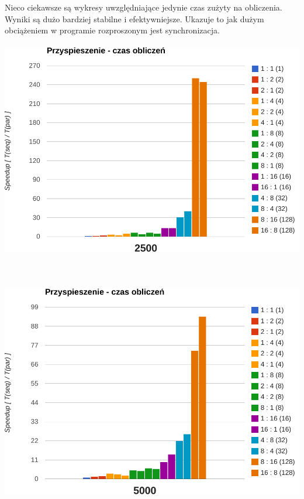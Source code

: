 \documentclass[paper=a4, fontsize=11pt]{scrartcl}	%
\numberwithin{equation}{section}		%
\numberwithin{figure}{section}			%
\numberwithin{table}{section}				%
\begin{document}
Nieco ciekawsze są wykresy uwzględniające jedynie czas zużyty na obliczenia.
Wyniki są dużo bardziej stabilne i efektywniejsze. Ukazuje to jak dużym
obciążeniem w programie rozproszonym jest synchronizacja. \\ \ \\

\includegraphics[width=135mm]{report/comp-speedup-2500.pdf} \\ \ \\ \ \\ \ \\

\includegraphics[width=135mm]{report/comp-speedup-5000.pdf} \\ \ \\ \ \\ \ \\
\end{document}
